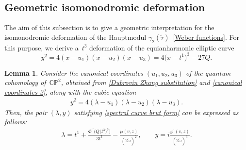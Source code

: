\documentclass[11pt]{article}
\numberwithin{equation}{section}
\numberwithin{equation}{section}
\newtheorem{Lemma}[Theorem]{Lemma}
\begin{document}
\subsection{Geometric isomonodromic deformation}\label{Geometric Isomonodromic deformation}

The aim of this subsection is to give a geometric interpretation for the isomonodromic deformation of the Hauptmodul $\gamma_2(\tilde\tau)$~\eqref{Weber functions}. For this purpose, we derive a~$t^3$ deformation of the equianharmonic elliptic curve
\[
y^2=4(x-u_1)(x-u_2)(x-u_3)=4\bigl(x-t^1\bigr)^3-27Q.
\]

\begin{Lemma}
Consider the canonical coordinates $(u_1, u_2, u_3)$ of the quantum cohomology \linebreak of~$\mathbb{CP}^2$, obtained from \eqref{Dubrovin Zhang substitution} and \eqref{canonical coordinates 2}, along with the cubic equation
\begin{gather}\label{spectral curve brut form}
y^2 = 4( \lambda - u_1)( \lambda - u_2)( \lambda - u_3).
\end{gather}
Then, the pair $(\lambda,y)$ satisfying \eqref{spectral curve brut form} can be expressed as follows:
\begin{gather}
\lambda=t^1+\frac{\Phi^{\prime\prime}\bigl(Q\bigl(t^3\bigr)^3\bigr)}{3t^3}-\frac{\wp(v,z)}{(2\tilde\omega)^2},\qquad
y=i\frac{\wp^{\prime}(v,z)}{(2\tilde\omega)^3}.\label{LG superpotential elliptic form first piece}
\end{gather}
\end{Lemma}
\end{document}
